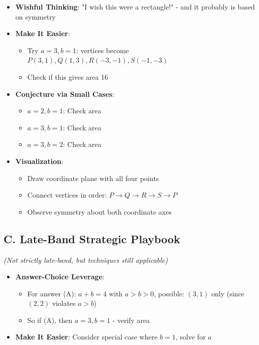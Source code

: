 \documentclass[]{article}
\begin{document}
\begin{strategicbox}
\begin{itemize}[leftmargin=*]
    \item \textbf{Wishful Thinking}: "I wish this were a rectangle!" - and it probably is based on symmetry
    
    \item \textbf{Make It Easier}: 
    \begin{itemize}
        \item Try $a=3, b=1$: vertices become $P(3,1), Q(1,3), R(-3,-1), S(-1,-3)$
        \item Check if this gives area 16
    \end{itemize}
    
    \item \textbf{Conjecture via Small Cases}: 
    \begin{itemize}
        \item $a=2, b=1$: Check area
        \item $a=3, b=1$: Check area
        \item $a=3, b=2$: Check area
    \end{itemize}
    
    \item \textbf{Visualization}: 
    \begin{itemize}
        \item Draw coordinate plane with all four points
        \item Connect vertices in order: $P \to Q \to R \to S \to P$
        \item Observe symmetry about both coordinate axes
    \end{itemize}
\end{itemize}

\subsection*{C. Late-Band Strategic Playbook}
\textit{(Not strictly late-band, but techniques still applicable)}
\begin{itemize}[leftmargin=*]
    \item \textbf{Answer-Choice Leverage}: 
    \begin{itemize}
        \item For answer (A): $a+b=4$ with $a>b>0$, possible: $(3,1)$ only (since $(2,2)$ violates $a>b$)
        \item So if (A), then $a=3, b=1$ - verify area
    \end{itemize}
    
    \item \textbf{Make It Easier}: Consider special case where $b=1$, solve for $a$
    

\end{itemize}
\end{strategicbox}
\end{document}

